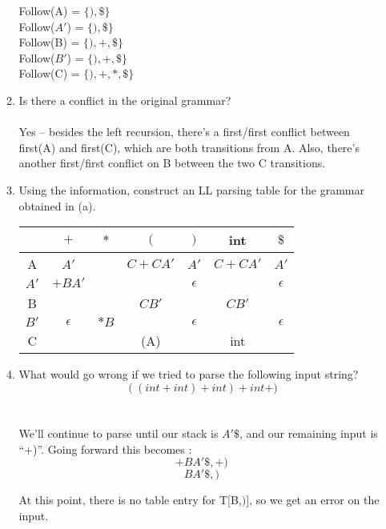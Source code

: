\begin{enumerate}
\begin{enumerate}
          Follow(A) = $\{), \$\}$\\
          Follow($A'$) = $\{), \$\}$\\
          Follow(B) = $\{), +, \$\}$\\
          Follow($B'$) = $\{),+, \$\}$\\
          Follow(C) = $\{), +, *, \$\}$\\


          \item Is there a conflict in the original grammar?\\\\

          Yes -- besides the left recursion, there’s a first/first conflict between first(A) and first(C), which are both transitions from A. Also, there’s another first/first conflict on B between the two C transitions.

          \item Using the information, construct an LL parsing table for the grammar obtained in (a).

          \begin{center}
            \begin{tabular}{ c|c|c|c|c|c|c } 
                 & $+$ & $*$ & $($ & $)$ & int & $\$$\\
               \hline
               A & $A'$ & & $C + CA'$ & $A'$ & $C + CA'$ & $A'$\\
               $A'$ & $+BA'$ & & & $\epsilon$ & & $\epsilon$\\
               B & & & $CB'$ & & $CB'$\\
               $B'$ & $\epsilon$ & $*B$ & & $\epsilon$ & & $\epsilon$\\
               C & & & (A) & & int\\
               \hline
            \end{tabular}
          \end{center}

          \item What would go wrong if we tried to parse the following input string?
          $$((int + int) + int)+int+)$$\\\\

          We'll continue to parse until our stack is $A'\$$, and our remaining input is ``+)''. Going forward this becomes :
          $$+BA'\$ , +)$$
          $$BA'\$ , ) $$

          At this point, there is no table entry for T[B,$)$], so we get an error on the input.
          \end{enumerate}


\end{enumerate}

